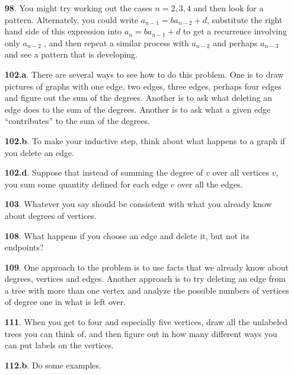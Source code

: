 \documentclass[10pt,]{book}
\theoremstyle{plain}
\theoremstyle{definition}
\theoremstyle{definition}
\numberwithin{equation}{chapter}
\begin{document}
\begin{itemize}[itemsep=1em]
\item[\textbf{98}.]\hypertarget{p-576}{}%
You might try working out the cases \(n=2,3,4\) and then look for a pattern. Alternately, you could write \(a_{n-1}=b a_{n-2} + d\), substitute the right hand side of this expression into \(a_{n}=b a_{n-1} + d\) to get a recurrence involving only \(a_{n-2}\) , and then repeat a similar process with \(a_{n-2}\) and perhaps \(a_{n-3}\) and see a pattern that is developing.%

\item[\textbf{102.a}.]\hypertarget{p-600}{}%
There are several ways to see how to do this problem. One is to draw pictures of graphs with one edge, two edges, three edges, perhaps four edges and figure out the sum of the degrees. Another is to ask what deleting an edge does to the sum of the degrees. Another is to ask what a given edge ``contributes'' to the sum of the degrees.%

\item[\textbf{102.b}.]\hypertarget{p-603}{}%
To make your inductive step, think about what happens to a graph if you delete an edge.%

\item[\textbf{102.d}.]\hypertarget{p-608}{}%
Suppose that instead of summing the degree of \(v\) over all vertices \(v\), you sum some quantity defined for each edge \(e\) over all the edges.%

\item[\textbf{103}.]\hypertarget{p-611}{}%
Whatever you say should be consistent with what you already know about degrees of vertices.%

\item[\textbf{108}.]\hypertarget{p-623}{}%
What happens if you choose an edge and delete it, but not its endpoints?%

\item[\textbf{109}.]\hypertarget{p-626}{}%
One approach to the problem is to use facts that we already know about degrees, vertices and edges. Another approach is to try deleting an edge from a tree with more than one vertex and analyze the possible numbers of vertices of degree one in what is left over.%

\item[\textbf{111}.]\hypertarget{p-632}{}%
When you get to four and especially five vertices, draw all the unlabeled trees you can think of, and then figure out in how many different ways you can put labels on the vertices.%

\item[\textbf{112.b}.]\hypertarget{p-637}{}%
Do some examples.%


\end{itemize}
\end{document}
